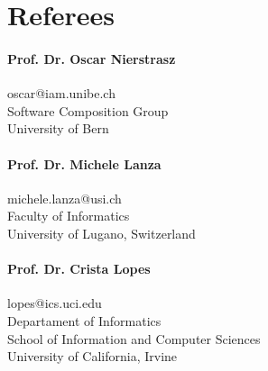 \documentclass[a4paper]{article}
\begin{document}




\section{Referees}


\paragraph{Prof. Dr. Oscar Nierstrasz\\}
{oscar@iam.unibe.ch\\
Software Composition Group\\ 
University of Bern}

\paragraph{Prof. Dr. Michele Lanza\\}
{michele.lanza@usi.ch\\
Faculty of Informatics\\
University of Lugano, Switzerland}

\paragraph{Prof. Dr. Crista Lopes\\}
{lopes@ics.uci.edu\\
Departament of Informatics\\
School of Information and Computer Sciences\\
University of California, Irvine
}
	

% 
\end{document}
